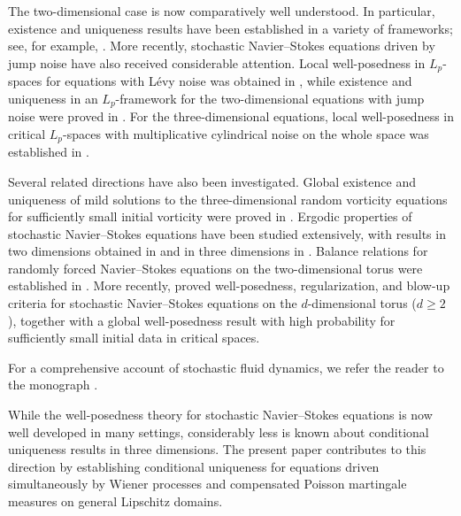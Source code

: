 \documentclass[11pt,reqno]{amsart}
\theoremstyle{definition}
\theoremstyle{remark}
\newcommand{\<}{\langle}
\renewcommand{\>}{\rangle}
\begin{document}
The two-dimensional case is now comparatively well understood. 
In particular, existence and uniqueness results have been established in a variety of frameworks; 
see, for example, \cite{AF2002,MS2002,AF2004,F2003,MR2005,M2009}. 
More recently, stochastic Navier--Stokes equations driven by jump noise 
have also received considerable attention. Local well-posedness 
in $L_p$-spaces for equations with L\'evy noise was obtained in \cite{MS2017}, 
while existence and uniqueness in an  $L_p$-framework for the two-dimensional equations 
with jump noise were proved in \cite{ZBL2019}. 
For the three-dimensional equations, local well-posedness in critical  
$L_p$-spaces with multiplicative cylindrical noise on the 
whole space was established in \cite{KWX2024}.

Several related directions have also been investigated. 
Global existence and uniqueness of mild solutions to the 
three-dimensional random vorticity equations for sufficiently 
small initial vorticity were proved in \cite{BR2017}. 
Ergodic properties of stochastic Navier--Stokes equations 
have been studied extensively, with results in two dimensions obtained in \cite{KS2000,KS2001,WMS2001,WM2001,B2002,MH2006} 
and in three dimensions in \cite{DD2003}. Balance relations 
for randomly forced Navier--Stokes equations on the two-dimensional 
torus were established in \cite{KP2005}. More recently, \cite{AV2024} 
proved well-posedness, regularization, 
and blow-up criteria for stochastic Navier--Stokes equations 
on the $d$-dimensional torus ($d\geq2$), together with a global well-posedness 
result with high probability for sufficiently small initial data in critical spaces.

For a comprehensive account of stochastic fluid dynamics, 
we refer the reader to the monograph \cite{F2008}. 

While the well-posedness theory for stochastic 
Navier--Stokes equations is now well developed in many settings, 
considerably less is known about conditional uniqueness results in three dimensions. 
The present paper contributes to this direction 
by establishing conditional uniqueness for equations 
driven simultaneously by Wiener processes and compensated 
Poisson martingale measures on general Lipschitz domains.
\end{document}
